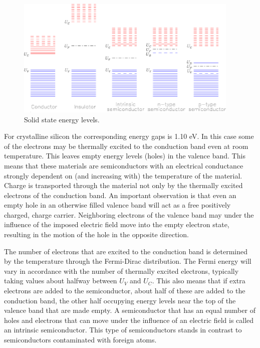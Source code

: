\begin{figure}[h]
	\centering
	\includegraphics[width=0.95\textwidth]{CCD_solstate.eps}
	\caption{Solid state energy levels.}
	\label{fig:CCD.figsolstate}
\end{figure}

For crystalline silicon the corresponding energy gaps is 1.10 eV. In
this case some of the electrons may be thermally excited to the
conduction band even at room temperature. This leaves empty energy
levels (holes) in the valence band. This means that these materials
are semiconductors with an electrical conductance strongly dependent
on (and increasing with) the temperature of the material. Charge is
transported through the material not only by the thermally excited
electrons of the conduction band. An important observation is that
even an empty hole in an otherwise filled valence band will act as a
free positively charged, charge carrier. Neighboring electrons of the
valence band may under the influence of the imposed electric field
move into the empty electron state, resulting in the motion of the
hole in the opposite direction.

The number of electrons that are excited to the conduction band is
determined by the temperature through the Fermi-Dirac
distribution. The Fermi energy will vary in accordance with the number
of thermally excited electrons, typically taking values about halfway
between $U_V$ and $U_C$. This also means that if extra electrons are
added to the semiconductor, about half of these are added to the
conduction band, the other half occupying energy levels near the top
of the valence band that are made empty. A semiconductor that has an
equal number of holes and electrons that can move under the influence
of an electric field is called an intrinsic semiconductor. This type
of semiconductors stands in contrast to semiconductors contaminated
with foreign atoms.

